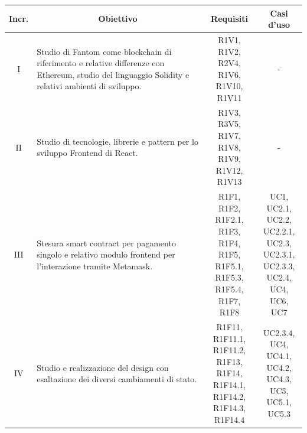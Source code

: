 \begin{table}[H]
  \centering
  \renewcommand{\arraystretch}{1.8}
  \begin{tabular}{c|p{6cm}|c|c}
    \rowcolor[HTML]{125E28}
    \color[HTML]{FFFFFF}\textbf{Incr.}
        & \multicolumn{1}{c}{\color[HTML]{FFFFFF}\textbf{Obiettivo}}
        & \multicolumn{1}{c}{\color[HTML]{FFFFFF}\textbf{Requisiti}}
        & \multicolumn{1}{c}{\color[HTML]{FFFFFF}\textbf{Casi d'uso}}                                                                                                                                                                 \\
    \hline
    I   & Studio di Fantom\glo{} come blockchain\glo{} di riferimento e relative differenze con Ethereum\glo{}, studio del linguaggio Solidity\glo{} e relativi ambienti di sviluppo. & \Shortunderstack{R1V1, R1V2,                  \\R2V4, R1V6,\\R1V10, R1V11\\} & - \\
    II  & Studio di tecnologie, librerie e pattern per lo sviluppo Frontend\glo{} di React.                                                                                           & \Shortunderstack{R1V3, R3V5,                  \\R1V7, R1V8,\\R1V9, R1V12,\\R1V13\\} & - \\
    III & Stesura smart contract\glo{} per pagamento singolo e relativo modulo frontend\glo{} per l'interazione tramite Metamask\glo{}.                                               & \Shortunderstack{R1F1, R1F2,                  \\R1F2.1, R1F3,\\R1F4, R1F5,\\R1F5.1, R1F5.3,\\R1F5.4, R1F7,\\R1F8\\} & \Shortunderstack{UC1, UC2.1,\\UC2.2, UC2.2.1,\\UC2.3, UC2.3.1,\\UC2.3.3, UC2.4,\\UC4, UC6,\\UC7\\}\\
    IV  & Studio e realizzazione del design con esaltazione dei diversi cambiamenti di stato.                                                                                         & \Shortunderstack{R1F11, R1F11.1,              \\R1F11.2, R1F13,\\R1F14, R1F14.1,\\R1F14.2, R1F14.3,\\R1F14.4\\} & \Shortunderstack{UC2.3.4, UC4,\\UC4.1, UC4.2,\\UC4.3, UC5,\\UC5.1, UC5.3\\}\\

\end{tabular}
\end{table}
